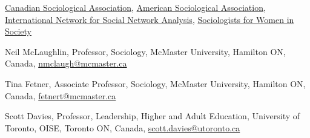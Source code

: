 \documentclass[9pt,usenames,dvipsnames]{article}
\begin{document}




\noindent \href{http://www.csa-scs.ca}{Canadian Sociological Association}, \href{http://www.asanet.org}{American Sociological Association}, \href{http://www.insna.org}{International Network for Social Network Analysis}, \href{http://www.socwomen.org}{Sociologists for Women in Society} \\

\newpage
{}

\ind Neil McLaughlin, Professor, Sociology, McMaster University, Hamilton ON, Canada, \href{mailto:nmclaugh@mcmaster.ca}{nmclaugh@mcmaster.ca}

\ind Tina Fetner, Associate Professor, Sociology, McMaster University, Hamilton ON, Canada, \href{mailto:fetnert@mcmaster.ca}{fetnert@mcmaster.ca}

\ind Scott Davies, Professor, Leadership, Higher and Adult Education, University of Toronto, OISE, Toronto ON, Canada, \href{mailto:scott.davies@utoronto.ca}{scott.davies@utoronto.ca}
\end{document}
